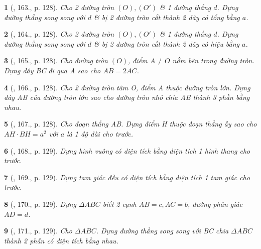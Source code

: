 \documentclass{article}
\newtheorem{baitoan}{}
\begin{document}
\begin{baitoan}[\cite{Binh_Toan_9_tap_1}, 163., p. 128]
	Cho 2 đường tròn $(O),(O')$ \& 1 đường thẳng $d$. Dựng đường thẳng song song với $d$ \& bị 2 đường tròn cắt thành 2 dây có tổng bằng $a$.
\end{baitoan}

\begin{baitoan}[\cite{Binh_Toan_9_tap_1}, 164., p. 128]
	Cho 2 đường tròn $(O),(O')$ \& 1 đường thẳng $d$. Dựng đường thẳng song song với $d$ \& bị 2 đường tròn cắt thành 2 dây có hiệu bằng $a$.
\end{baitoan}

\begin{baitoan}[\cite{Binh_Toan_9_tap_1}, 165., p. 128]
	Cho đường tròn $(O)$, điểm $A\ne O$ nằm bên trong đường tròn. Dựng dây BC đi qua A sao cho $AB = 2AC$.
\end{baitoan}

\begin{baitoan}[\cite{Binh_Toan_9_tap_1}, 166., p. 128]
	Cho 2 đường tròn tâm O, điểm A thuộc đường tròn lớn. Dựng dây AB của đường tròn lớn sao cho đường tròn nhỏ chia AB thành 3 phần bằng nhau.
\end{baitoan}

\begin{baitoan}[\cite{Binh_Toan_9_tap_1}, 167., p. 128]
	Cho đoạn thẳng AB. Dựng điểm H thuộc đoạn thẳng ấy sao cho $AH\cdot BH = a^2$ với $a$ là 1 độ dài cho trước.
\end{baitoan}

\begin{baitoan}[\cite{Binh_Toan_9_tap_1}, 168., p. 129]
	Dựng hình vuông có diện tích bằng diện tích 1 hình thang cho trước.
\end{baitoan}

\begin{baitoan}[\cite{Binh_Toan_9_tap_1}, 169., p. 129]
	Dựng tam giác đều có diện tích bằng diện tích 1 tam giác cho trước.
\end{baitoan}

\begin{baitoan}[\cite{Binh_Toan_9_tap_1}, 170., p. 129]
	Dựng $\Delta ABC$ biết 2 cạnh $AB = c,AC = b$, đường phân giác $AD = d$.
\end{baitoan}

\begin{baitoan}[\cite{Binh_Toan_9_tap_1}, 171., p. 129]
	Cho $\Delta ABC$. Dựng đường thẳng song song với BC chia $\Delta ABC$ thành 2 phần có diện tích bằng nhau.
\end{baitoan}
\end{document}

